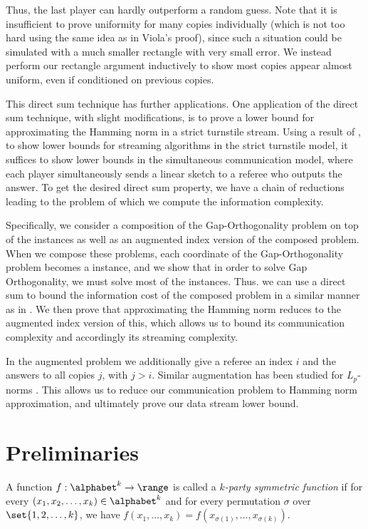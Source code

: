 Thus, the last player can hardly outperform a random guess. 
Note that it is insufficient to prove uniformity for many copies individually 
(which is not too hard using the same idea as in Viola's proof), 
since such a situation could be simulated with a much smaller rectangle 
with very small error.
We instead perform our rectangle argument inductively to show most 
copies appear almost uniform, even if conditioned on previous copies. 


This direct sum technique has further applications. One application {\color{black} of the direct sum technique, with slight modifications,}
is to prove a lower bound for approximating the Hamming norm 
in a strict turnstile stream. 
Using a result of \cite{AHLW16}, to show lower bounds for streaming algorithms in the
strict turnstile model, it suffices to show lower bounds in the simultaneous communication model, where each player simultaneously sends a linear sketch to a referee who outputs the answer. 
To get the desired direct sum property, we have a chain of reductions leading to the \sumequal problem
%
of which we compute the information complexity.  %

Specifically, we consider a composition of the Gap-Orthogonality problem on top of the \sumequal instances as well as an augmented index version of the composed problem. When we compose these problems, each coordinate of the Gap-Orthogonality problem becomes a \sumequal instance, and we show that in order to solve Gap Orthogonality, we must solve most of the \sumequal instances. Thus. we can use a direct sum to bound the information cost of the composed problem in a similar manner as in \cite{wz12}. We then prove that approximating the Hamming norm reduces to the augmented index version of this, which allows us to bound its communication complexity and accordingly its streaming complexity.

In the augmented problem 
we additionally give a referee an index $i$ and the answers to all copies $j$, with $j > i$. 
Similar augmentation has been studied for $L_p$-norms \cite{knw10b}. 
This allows us to reduce our communication problem to Hamming norm approximation, and ultimately prove our data stream lower bound. 


%
%
\section{Preliminaries}
\label{sec:pre}


A function $f:\alphabet^k \to \range$ is called a \emph{$k$-party symmetric function} if for every $(x_1,x_2,\dots,x_k)\in \alphabet^k$ and for every permutation $\sigma$ over $\set{1,2,\dots,k}$,
we have 
$f(x_1,\dots,x_k) = f\left(x_{\sigma(1)},  \dots, x_{\sigma(k)}\right).$

